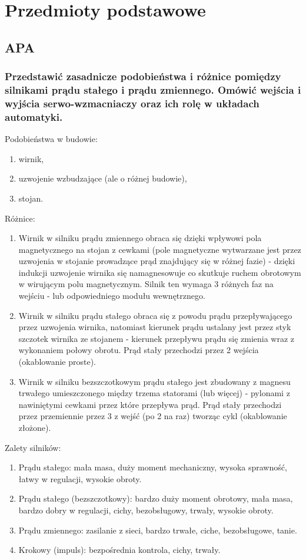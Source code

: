 {\let\clearpage\relax\chapter{Przedmioty podstawowe}}

\section{APA}
\subsection{Przedstawić zasadnicze podobieństwa i różnice pomiędzy silnikami prądu stałego i prądu zmiennego. Omówić wejścia i wyjścia serwo-wzmacniaczy oraz ich rolę w układach automatyki.}

Podobieństwa w budowie:
\begin{enumerate}
    \item wirnik,
    \item uzwojenie wzbudzające (ale o różnej budowie),
    \item stojan.
\end{enumerate}


Różnice:
\begin{enumerate}
    \item Wirnik w silniku prądu zmiennego obraca się dzięki wpływowi pola magnetycznego na stojan z cewkami (pole magnetyczne wytwarzane jest przez uzwojenia w stojanie prowadzące prąd znajdujący się w różnej fazie) - dzięki indukcji uzwojenie wirnika się namagnesowuje co skutkuje ruchem obrotowym w wirującym polu magnetycznym. Silnik ten wymaga 3 różnych faz na wejściu - lub odpowiedniego modułu wewnętrznego.
    \item Wirnik w silniku prądu stałego obraca się z powodu prądu przepływającego przez uzwojenia wirnika, natomiast kierunek prądu ustalany jest przez styk szczotek wirnika ze stojanem - kierunek przepływu prądu się zmienia wraz z wykonaniem połowy obrotu. Prąd stały przechodzi przez 2 wejścia (okablowanie proste).
    \item Wirnik w silniku bezszczotkowym prądu stałego jest zbudowany z magnesu trwałego umieszczonego między trzema statorami (lub więcej) - pylonami z nawiniętymi cewkami przez które przepływa prąd. Prąd stały przechodzi przez przemiennie przez 3 z wejść (po 2 na raz) tworząc cykl (okablowanie złożone).
\end{enumerate}

Zalety silników:
\begin{enumerate}
    \item Prądu stałego: mała masa, duży moment mechaniczny, wysoka sprawność, łatwy w regulacji, wysokie obroty.
    \item Prądu stałego (bezszczotkowy): bardzo duży moment obrotowy, mała masa, bardzo dobry w regulacji, cichy, bezobsługowy, trwały, wysokie obroty.
    \item Prądu zmiennego: zasilanie z sieci, bardzo trwałe, ciche, bezobsługowe, tanie.
    \item Krokowy (impuls): bezpośrednia kontrola, cichy, trwały.
\end{enumerate}

